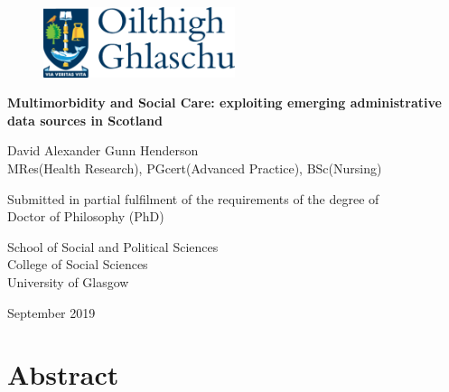 \documentclass[12pt,a4paper,oneside,table]{report}
\title{}
\author{}
\date{}
\begin{document}

\thispagestyle{empty}

\begin{centering}

\begin{figure}[h]
  \centering
    \includegraphics[width = 0.5\textwidth]{figures/title-page/Ghlaschu.pdf}
\end{figure}

\vspace{2 cm}

\Huge

{\bf Multimorbidity and Social Care: exploiting emerging administrative data sources in Scotland}

\vspace{1.5 cm}

\Large
David Alexander Gunn Henderson \\
MRes(Health Research), PGcert(Advanced Practice), BSc(Nursing)

\vspace{1.5 cm}

\normalsize
Submitted in partial fulfilment of the requirements of the degree of \\
Doctor of Philosophy (PhD)

\vspace{1.5 cm}

\normalsize
School of Social and Political Sciences \\
College of Social Sciences\\
University of Glasgow

September 2019

\end{centering}

\newpage
\pagestyle{fancy}

\fancyhead[LE,RO]{}
\fancyhead[LO,RE]{}
\renewcommand{\headrulewidth}{0pt}
\renewcommand{\footrulewidth}{0pt}

\section*{Abstract}

\thispagestyle{empty}
\end{document}
